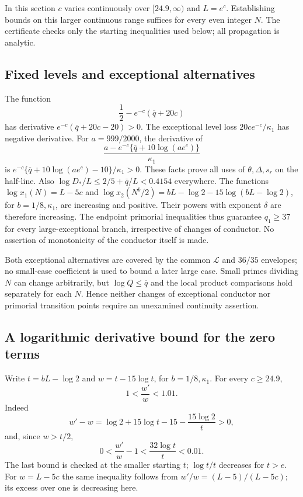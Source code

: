 \documentclass[11pt]{article}
\theoremstyle{definition}
\newcommand{\Flow}{\mathcal L}
\begin{document}
In this section $c$ varies continuously over $[24.9,\infty)$ and
$L=e^c$.  Establishing bounds on this larger continuous range suffices
for every even integer $N$.  The certificate checks only the starting
inequalities used below; all propagation is analytic.

\subsection{Fixed levels and exceptional alternatives}

The function
\[
 \frac12-e^{-c}(\overline q+20c)
\]
has derivative $e^{-c}(\overline q+20c-20)>0$.
The exceptional level loss $20ce^{-c}/\kappa_1$ has negative derivative.
For $a=999/2000$, the derivative of
\[
 \frac{a-e^{-c}\{\overline q+10\log(ae^c)\}}{\kappa_1}
\]
is $e^{-c}\{\overline q+10\log(ae^c)-10\}/\kappa_1>0$.
These facts prove all uses of $\theta,\Delta,s_r$ on the half-line.
Also $\log D_*/L\le2/5+\overline q/L<0.4154$ everywhere.
The functions $\log x_1(N)=L-5c$ and
$\log x_2(N^b/2)=bL-\log2-15\log(bL-\log2)$, for
$b=1/8,\kappa_1$, are increasing and positive.
Their powers with exponent $\delta$ are therefore increasing.
The endpoint primorial inequalities thus guarantee $q_1\ge37$ for
every large-exceptional branch, irrespective of changes of conductor.
No assertion of monotonicity of the conductor itself is made.

Both exceptional alternatives are covered by the common
$\Flow$ and $36/35$ envelopes; no small-case coefficient is used
to bound a later large case.  Small primes dividing $N$ can change
arbitrarily, but $\log Q\le\overline q$ and the local product comparisons
hold separately for each $N$.  Hence neither changes of exceptional
conductor nor primorial transition points require an unexamined
continuity assertion.

\subsection{A logarithmic derivative bound for the zero terms}

Write $t=bL-\log2$ and $w=t-15\log t$, for
$b=1/8,\kappa_1$.
For every $c\ge24.9$,
\begin{equation}\label{eq:wderivative}
 1<\frac{w'}w<1.01.
\end{equation}
Indeed
\[
 w'-w=\log2+15\log t-15-\frac{15\log2}{t}>0,
\]
and, since $w>t/2$,
\[
 0<\frac{w'}w-1
 <\frac{32\log t}{t}<0.01.
\]
The last bound is checked at the smaller starting $t$;
$\log t/t$ decreases for $t>e$.
For $w=L-5c$ the same inequality follows from
$w'/w=(L-5)/(L-5c)$; its excess over one is decreasing here.
\end{document}
